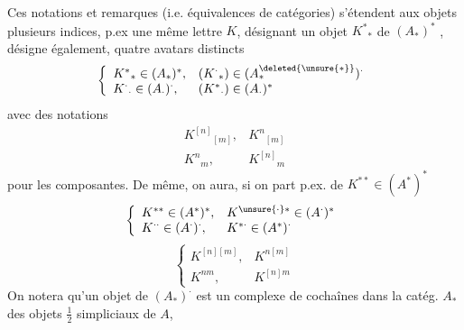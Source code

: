 Ces  notations et remarques (i.e. équivalences de
catégories) s'étendent aux objets 
 plusieurs indices, p.ex 
une même lettre $K$, désignant 
un objet ${K^*}_*$ de $(A_*)^*$ , désigne également,
 quatre avatars distincts
\[
 \left\{\begin{array}{ll}
 {K^*}_*\in(A_*)^*,&({K^{\cdot}}_*)\in(A^{\deleted{\unsure{*}}}_*)^{\cdot}\\
 {K^{\cdot}}_{\cdot}\in(A_{\cdot})^{\cdot},&({K^*}_{\cdot})\in(A_{\cdot})^*
 \end{array}\right.
\]
avec des notations
\[
 \begin{array}{ll}
 {K^{[n]}}_{[m]},&{K^n}_{[m]}\\
 {K^n}_m,&{K^{[n]}}_m
 \end{array}
\]
pour les composantes. De même, on aura, si on part p.ex. de
$K^{**}\in(A^*)^*$
\[
 \left\{\begin{array}{ll}
 K^{**}\in(A^*)^*,&K^{\unsure{\cdot}*}\in(A^{\cdot})^*\\
 K^{\cdot\cdot}\in(A^{\cdot})^{\cdot},&K^{*\cdot}\in(A^*)^{\cdot}
 \end{array}\right.
\]
\[
 \left\{\begin{array}{ll}
 K^{[n][m]},&K^{n[m]}\\
 K^{nm},&K^{[n]m}
 \end{array}\right.
\]
On notera qu'un objet de $(A_*)^{\cdot}$ est un complexe de cochaînes
dans la catég. $A_*$ des objets $\tfrac12$ simpliciaux de $A$,


